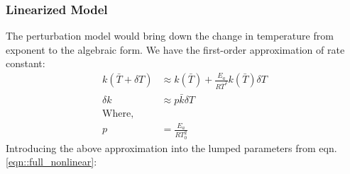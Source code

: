 \subsubsection{Linearized Model}
The perturbation model would bring down the change in
temperature from exponent to the algebraic form. We have the first-order 
approximation of rate constant:
\begin{align*}
    k(\bar T + \delta T) &\approx k(\bar T) + \frac{E_a}{R\bar T^2} k(\bar T) \delta T\\
    \delta k &\approx p \bar k \delta T\\
    \text{Where,} \quad &\\
    p &= \frac{E_a}{RT_0^2}
\end{align*}
Introducing the above approximation into the lumped parameters from eqn.\ref{eqn::full_nonlinear}:
